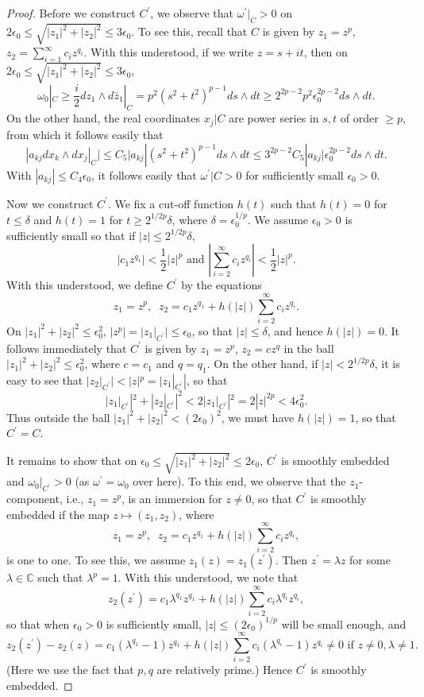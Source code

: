 \documentclass[11pt]{amsart}
\theoremstyle{plain}
\numberwithin{theorem}{section}
\theoremstyle{definition}
\newcommand{\C}{{\mathbb C}}
\begin{document}
\begin{proof}
Before we construct $C^\prime$, we observe that $\omega^\prime|_C>0$ on 
$2\epsilon_0\leq \sqrt{|z_1|^2+|z_2|^2}\leq 3\epsilon_0$. To see this, recall that $C$ is given by
$z_1=z^p$, $z_2=\sum_{i=1}^\infty c_i z^{q_i}$. With this understood, if we write $z=s+it$, then
on $2\epsilon_0\leq \sqrt{|z_1|^2+|z_2|^2}\leq 3\epsilon_0$,
$$
\omega_0|_C\geq \frac{i}{2} dz_1\wedge d\bar{z}_1|_{C}=p^2 (s^2+t^2)^{p-1} ds\wedge dt\geq 2^{2p-2}p^2
\epsilon_0^{2p-2} ds\wedge dt.
$$
On the other hand, the real coordinates $x_j|C$ are power series in $s,t$ of order $\geq p$, from 
which it follows easily that 
$$
|a_{kj} dx_k\wedge dx_j|_C|\leq C_5 |a_{kj}| (s^2+t^2)^{p-1} ds\wedge dt\leq 3^{2p-2} C_5 |a_{kj}| \epsilon_0^{2p-2} ds\wedge dt.
$$
With $|a_{kj}|\leq C_4 \epsilon_0$, it follows easily that $\omega^\prime|C>0$ for sufficiently small
$\epsilon_0>0$.

Now we construct $C^\prime$. We fix a cut-off function $h(t)$ such that $h(t)=0$ for 
$t\leq \delta$ and $h(t)=1$ for $t\geq 2^{1/2p}\delta$, where $\delta=\epsilon_0^{1/p}$.
We assume $\epsilon_0>0$ is sufficiently small so that if $|z|\leq 2^{1/2p}\delta$, 
$$
|c_1z^{q_1}|<\frac{1}{2}|z|^p \mbox{ and } |\sum_{i=2}^\infty c_i z^{q_i}|<\frac{1}{2}|z|^p.
$$
With this understood, we define $C^\prime$ by the equations
$$
z_1=z^p,\;\; z_2=c_1z^{q_1} +h(|z|) \sum_{i=2}^\infty c_i z^{q_i}.
$$
On $|z_1|^2+|z_2|^2\leq \epsilon_0^2$, $|z^p|=|z_1|_{C^\prime}|\leq \epsilon_0$, so that 
$|z|\leq\delta$, and hence $h(|z|)=0$. It follows immediately that $C^\prime$ is given by 
$z_1=z^p$, $z_2=c z^q$ in the ball $|z_1|^2+|z_2|^2\leq \epsilon_0^2$, where $c=c_1$ 
and $q=q_1$. On the other hand, if $|z|<2^{1/2p}\delta$, it is easy to see that 
$|z_2|_{C^\prime}|< |z|^p=|z_1|_{C^\prime}|$, so that 
$$
|z_1|_{C^\prime}|^2+|z_2|_{C^\prime}|^2<2|z_1|_{C^\prime}|^2=2|z|^{2p}<4\epsilon_0^2.
$$
Thus outside the ball $|z_1|^2+|z_2|^2<(2\epsilon_0)^2$, we must have $h(|z|)=1$, so that
$C^\prime=C$. 

It remains to show that on $\epsilon_0\leq \sqrt{|z_1|^2+|z_2|^2}\leq 2\epsilon_0$, $C^\prime$ is
smoothly embedded and $\omega_0|_{C^\prime}>0$ (as $\omega^\prime=\omega_0$ over here).
To this end, we observe that the $z_1$-component, i.e., $z_1=z^p$, is an immersion for $z\neq 0$, so that 
$C^\prime$ is smoothly embedded if the map $z\mapsto (z_1,z_2)$, where 
$$
z_1=z^p,\;\; z_2=c_1z^{q_1} +h(|z|) \sum_{i=2}^\infty c_i z^{q_i},
$$
is one to one. To see this, we assume $z_1(z)=z_1(z^\prime)$. Then $z^\prime=\lambda z$ for some
$\lambda\in\C$ such that $\lambda^p=1$. With this understood, we note that
$$
z_2(z^\prime)=c_1\lambda^{q_1} z^{q_1}+h(|z|) \sum_{i=2}^\infty c_i \lambda^{q_i} z^{q_i},
$$
so that when $\epsilon_0>0$ is sufficiently small, $|z|\leq (2\epsilon_0)^{1/p}$ will be small enough, and 
$$
z_2(z^\prime)-z_2(z)=c_1(\lambda^{q_1}-1)z^{q_1}
+h(|z|) \sum_{i=2}^\infty c_i (\lambda^{q_i}-1) z^{q_i}\neq 0 \mbox{ if } z\neq 0, \lambda\neq 1.
$$
(Here we use the fact that $p,q$ are relatively prime.) Hence $C^\prime$ is smoothly embedded.


\end{proof}
\end{document}
